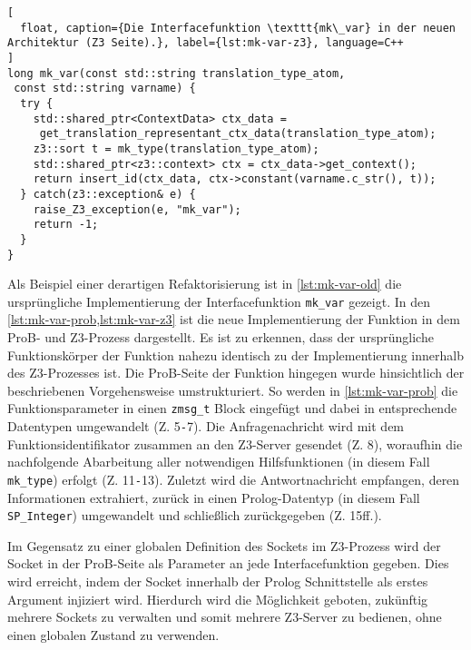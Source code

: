 \begin{lstlisting}[
  float, caption={Die Interfacefunktion \texttt{mk\_var} in der neuen Architektur (Z3 Seite).}, label={lst:mk-var-z3}, language=C++
]
long mk_var(const std::string translation_type_atom,
 const std::string varname) {
  try {
    std::shared_ptr<ContextData> ctx_data =
     get_translation_representant_ctx_data(translation_type_atom);
    z3::sort t = mk_type(translation_type_atom);
    std::shared_ptr<z3::context> ctx = ctx_data->get_context();
    return insert_id(ctx_data, ctx->constant(varname.c_str(), t));
  } catch(z3::exception& e) {
    raise_Z3_exception(e, "mk_var");
    return -1;
  }
}
\end{lstlisting}

Als Beispiel einer derartigen Refaktorisierung ist in \cref{lst:mk-var-old} die ursprüngliche Implementierung der Interfacefunktion \texttt{mk\_var} gezeigt.
In den \cref{lst:mk-var-prob,lst:mk-var-z3} ist die neue Implementierung der Funktion in dem ProB- und Z3-Prozess dargestellt.
Es ist zu erkennen, dass der ursprüngliche Funktionskörper der Funktion nahezu identisch zu der Implementierung innerhalb des Z3-Prozesses ist.
Die ProB-Seite der Funktion hingegen wurde hinsichtlich der beschriebenen Vorgehensweise umstrukturiert.
So werden in \cref{lst:mk-var-prob} die Funktionsparameter in einen \texttt{zmsg\_t} Block eingefügt und dabei in entsprechende Datentypen umgewandelt (Z. 5\texttt{-}7).
Die Anfragenachricht wird mit dem Funktionsidentifikator zusammen an den Z3-Server gesendet (Z. 8), woraufhin
die nachfolgende Abarbeitung aller notwendigen Hilfsfunktionen (in diesem Fall \texttt{mk\_type}) erfolgt (Z. 11\texttt{-}13).
Zuletzt wird die Antwortnachricht empfangen, deren Informationen extrahiert, zurück in einen Prolog-Datentyp (in diesem Fall \texttt{SP\_Integer}) umgewandelt und schließlich zurückgegeben (Z. 15ff.).

Im Gegensatz zu einer globalen Definition des Sockets im Z3-Prozess wird der Socket in der ProB-Seite als Parameter an jede Interfacefunktion gegeben.
Dies wird erreicht, indem der Socket innerhalb der Prolog Schnittstelle als erstes Argument injiziert wird.
Hierdurch wird die Möglichkeit geboten, zukünftig mehrere Sockets zu verwalten und somit mehrere Z3-Server zu bedienen, ohne einen globalen Zustand zu verwenden.

